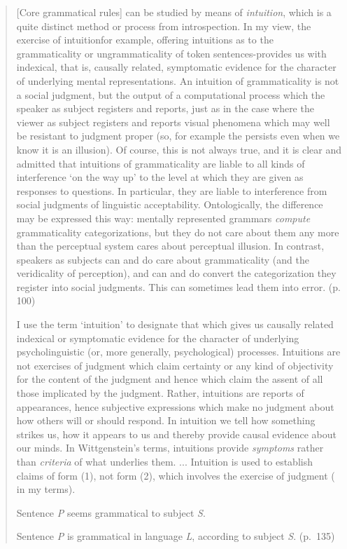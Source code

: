 \begin{quote}
[Core grammatical rules] can be studied by means of \textit{intuition}, which is a quite distinct method or process from introspection. In my view, the exercise of intuition\schdash{}for example, offering intuitions as to the grammaticality or ungrammaticality of token sentences-provides us with indexical, that is, causally related, symptomatic evidence for the character of underlying mental representations. An intuition of grammaticality is not a social judgment, but the output of a computational process which the speaker as subject registers and reports, just as in the case where the viewer as subject registers and reports visual phenomena which may well be resistant to judgment proper (so, for example the  persists even when we know it is an illusion). Of course, this is not always true, and it is clear and admitted that intuitions of grammaticality are liable to all kinds of interference `on the way up' to the level at which they are given as responses to questions. In particular, they are liable to interference from social judgments of linguistic acceptability. Ontologically, the difference may be expressed this way: mentally represented grammars \textit{compute} grammaticality categorizations, but they do not care about them any more than the perceptual system cares about perceptual illusion. In contrast, speakers as subjects can and do care about grammaticality (and the veridicality of perception), and can and do convert the categorization they register into social judgments. This can sometimes lead them into error. (p. 100)

I use the term `intuition' to designate that which gives us causally related indexical or symptomatic evidence for the character of underlying psycholinguistic (or, more generally, psychological) processes. Intuitions are not exercises of judgment which claim certainty or any kind of objectivity for the content of the judgment and hence which claim the assent of all those implicated by the judgment. Rather, intuitions are reports of appearances, hence subjective expressions which make no judgment about how others will or should respond. In intuition we tell how something strikes us, how it appears to us and thereby provide causal evidence about our minds. In Wittgenstein's terms, intuitions provide \textit{symptoms} rather than \textit{criteria} of what underlies them. ... Intuition is used to establish claims of form (1), not form (2), which involves the exercise of judgment ( in my terms).

\begin{exe}
Sentence \textit{P} seems grammatical to subject \textit{S}.
\end{exe}

\begin{exe}
	  Sentence \textit{P} is grammatical in language \textit{L}, according to subject
\textit{S}. (p.~135)
\end{exe}

\end{quote}

